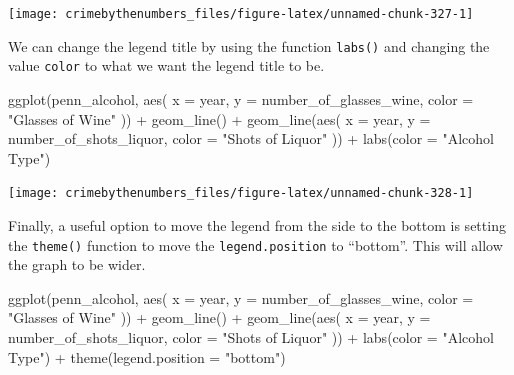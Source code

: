 \documentclass[
  a4paper,
]{krantz}
\makeatletter
\newenvironment{Shaded}{\begin{snugshade}}{\end{snugshade}}
\newcommand{\AttributeTok}[1]{\textcolor[rgb]{0.77,0.63,0.00}{#1}}
\newcommand{\FunctionTok}[1]{\textcolor[rgb]{0.00,0.00,0.00}{#1}}
\newcommand{\NormalTok}[1]{#1}
\newcommand{\SpecialCharTok}[1]{\textcolor[rgb]{0.00,0.00,0.00}{#1}}
\newcommand{\StringTok}[1]{\textcolor[rgb]{0.31,0.60,0.02}{#1}}
\newenvironment{kframe}{%
\medskip{}
\setlength{\fboxsep}{.8em}
 \def\at@end@of@kframe{}%
 \ifinner\ifhmode%
  \def\at@end@of@kframe{\end{minipage}}%
  \begin{minipage}{\columnwidth}%
 \fi\fi%
 \def\FrameCommand##1{\hskip\@totalleftmargin \hskip-\fboxsep
 \colorbox{shadecolor}{##1}\hskip-\fboxsep
     \hskip-\linewidth \hskip-\@totalleftmargin \hskip\columnwidth}%
 \MakeFramed {\advance\hsize-\width
   \@totalleftmargin\z@ \linewidth\hsize
   \@setminipage}}%
 {\par\unskip\endMakeFramed%
 \at@end@of@kframe}
\renewenvironment{Shaded}{\begin{kframe}}{\end{kframe}}
\makeatother
\begin{document}
\begin{center}\texttt{[image: crimebythenumbers\_files/figure-latex/unnamed-chunk-327-1]} \end{center}

We can change the legend title by using the function
\texttt{labs()} and changing the value \texttt{color} to
what we want the legend title to be.

\begin{Shaded}
\begin{Highlighting}[]
\FunctionTok{ggplot}\NormalTok{(penn\_alcohol, }\FunctionTok{aes}\NormalTok{(}
  \AttributeTok{x =}\NormalTok{ year,}
  \AttributeTok{y =}\NormalTok{ number\_of\_glasses\_wine,}
  \AttributeTok{color =} \StringTok{"Glasses of Wine"}
\NormalTok{)) }\SpecialCharTok{+}
  \FunctionTok{geom\_line}\NormalTok{() }\SpecialCharTok{+}
  \FunctionTok{geom\_line}\NormalTok{(}\FunctionTok{aes}\NormalTok{(}
    \AttributeTok{x =}\NormalTok{ year,}
    \AttributeTok{y =}\NormalTok{ number\_of\_shots\_liquor,}
    \AttributeTok{color =} \StringTok{"Shots of Liquor"}
\NormalTok{  )) }\SpecialCharTok{+}
  \FunctionTok{labs}\NormalTok{(}\AttributeTok{color =} \StringTok{"Alcohol Type"}\NormalTok{)}
\end{Highlighting}
\end{Shaded}

\begin{center}\texttt{[image: crimebythenumbers\_files/figure-latex/unnamed-chunk-328-1]} \end{center}

Finally, a useful option to move the legend from the side to
the bottom is setting the \texttt{theme()} function to move
the \texttt{legend.position} to ``bottom''. This will allow
the graph to be wider.

\begin{Shaded}
\begin{Highlighting}[]
\FunctionTok{ggplot}\NormalTok{(penn\_alcohol, }\FunctionTok{aes}\NormalTok{(}
  \AttributeTok{x =}\NormalTok{ year,}
  \AttributeTok{y =}\NormalTok{ number\_of\_glasses\_wine,}
  \AttributeTok{color =} \StringTok{"Glasses of Wine"}
\NormalTok{)) }\SpecialCharTok{+}
  \FunctionTok{geom\_line}\NormalTok{() }\SpecialCharTok{+}
  \FunctionTok{geom\_line}\NormalTok{(}\FunctionTok{aes}\NormalTok{(}
    \AttributeTok{x =}\NormalTok{ year,}
    \AttributeTok{y =}\NormalTok{ number\_of\_shots\_liquor,}
    \AttributeTok{color =} \StringTok{"Shots of Liquor"}
\NormalTok{  )) }\SpecialCharTok{+}
  \FunctionTok{labs}\NormalTok{(}\AttributeTok{color =} \StringTok{"Alcohol Type"}\NormalTok{) }\SpecialCharTok{+}
  \FunctionTok{theme}\NormalTok{(}\AttributeTok{legend.position =} \StringTok{"bottom"}\NormalTok{)}
\end{Highlighting}
\end{Shaded}
\end{document}
